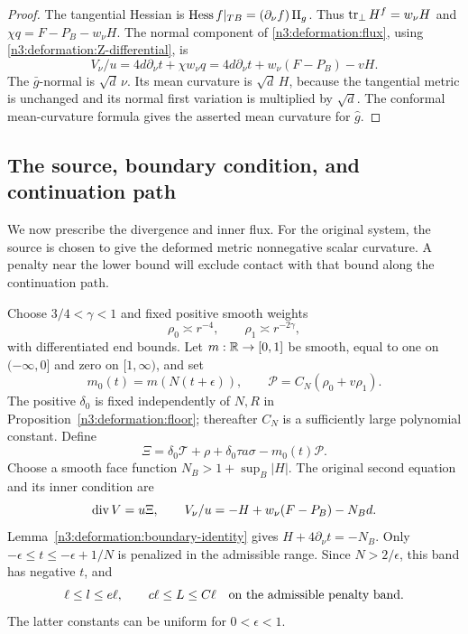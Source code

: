 \begin{proof}
The tangential Hessian is
$\operatorname{Hess} f|_{TB}=(\partial_\nu f)\operatorname{II}_g$.
Thus $\operatorname{tr}_\perp H^f=w_\nu H$ and
$\chi q=F-P_B-w_\nu H$.
The normal component of \eqref{n3:deformation:flux}, using
\eqref{n3:deformation:Z-differential}, is
\[
 V_\nu/u=4d\partial_\nu t+\chi w_\nu q
        =4d\partial_\nu t+w_\nu(F-P_B)-vH.
\]
The $\bar g$-normal is $\sqrt d\,\nu$. Its mean curvature is $\sqrt d\,H$,
because the tangential metric is unchanged and its normal first variation
is multiplied by $\sqrt d$. The conformal mean-curvature formula gives
the asserted mean curvature for $\hat g$.
\end{proof}

\subsection{The source, boundary condition, and continuation path}

We now prescribe the divergence and inner flux. For the original system,
the source is chosen to give the deformed metric nonnegative scalar
curvature. A penalty near the lower bound will exclude contact with that
bound along the continuation path.

Choose $3/4<\gamma<1$ and fixed positive smooth weights
\[
 \rho_0\asymp r^{-4},\qquad \rho_1\asymp r^{-2\gamma},
\]
with differentiated end bounds. Let $m:\mathbb R\to[0,1]$ be smooth, equal to one
on $(-\infty,0]$ and zero on $[1,\infty)$, and set
\[
 m_0(t)=m(N(t+\epsilon)),\qquad
 \mathcal P=C_N(\rho_0+v\rho_1).
\]
The positive $\delta_0$ is fixed independently of $N,R$ in
Proposition~\ref{n3:deformation:floor}; thereafter $C_N$ is a sufficiently
large polynomial constant. Define
\begin{equation}\label{n3:deformation:source}
 \Xi=\delta_0\mathcal T+\rho+\delta_0\tau a\sigma-m_0(t)\mathcal P.
\end{equation}
Choose a smooth face function $N_B>1+\sup_B|H|$.
The original second equation and its inner condition are
\begin{equation}\label{n3:deformation:original-second-equation}
 \operatorname{div} V=u\Xi,\qquad V_\nu/u=-H+w_\nu(F-P_B)-N_Bd.
\end{equation}
Lemma~\ref{n3:deformation:boundary-identity} gives
$H+4\partial_\nu t=-N_B$.
Only $-\epsilon\le t\le-\epsilon+1/N$ is penalized in the admissible range.
Since $N>2/\epsilon$, this band has negative $t$, and
\begin{equation}\label{n3:deformation:penalty-band}
 \ell\le l\le e\ell,\qquad c\ell\le L\le C\ell
 \quad\hbox{on the admissible penalty band}.
\end{equation}
The latter constants can be uniform for $0<\epsilon<1$.

